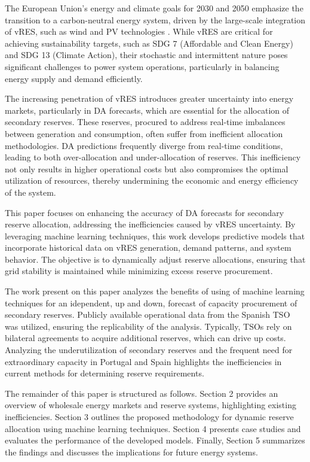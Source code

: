 The European Union's energy and climate goals for 2030 and 2050 emphasize the transition to a carbon-neutral energy system, driven by the large-scale integration of \gls{vRES}, such as wind and \gls{PV} technologies \cite{Perissi2022}. While \gls{vRES} are critical for achieving sustainability targets, such as \gls{SDG} 7 (Affordable and Clean Energy) and \gls{SDG} 13 (Climate Action), their stochastic and intermittent nature poses significant challenges to power system operations, particularly in balancing energy supply and demand efficiently.\cite{Ocker2017}\cite{Frade2019_wind}  \par
The increasing penetration of \gls{vRES} introduces greater uncertainty into energy markets, particularly in \gls{DA}  forecasts, which are essential for the allocation of secondary reserves. These reserves, procured to address real-time imbalances between generation and consumption, often suffer from inefficient allocation methodologies. \gls{DA} predictions frequently diverge from real-time conditions, leading to both over-allocation and under-allocation of reserves. This inefficiency not only results in higher operational costs but also compromises the optimal utilization of resources, thereby undermining the economic and energy efficiency of the system.\par
This paper focuses on enhancing the accuracy of \gls{DA}  forecasts for secondary reserve allocation, addressing the inefficiencies caused by \gls{vRES} uncertainty. By leveraging machine learning techniques, this work develops predictive models that incorporate historical data on \gls{vRES} generation, demand patterns, and system behavior. The objective is to dynamically adjust reserve allocations, ensuring that grid stability is maintained while minimizing excess reserve procurement.\par
The work present on this paper analyzes the benefits of using of machine learning techniques for an idependent, up and down, forecast of capacity procurement of secondary reserves. Publicly available operational data from the Spanish \gls{TSO} was utilized, ensuring the replicability of the analysis. Typically, \gls{TSO}s rely on bilateral agreements to acquire additional reserves, which can drive up costs. Analyzing the underutilization of secondary reserves and the frequent need for extraordinary capacity in Portugal and Spain highlights the inefficiencies in current methods for determining reserve requirements. \cite{EstanqueiroD5} \par
The remainder of this paper is structured as follows. Section 2 provides an overview of wholesale energy markets and reserve systems, highlighting existing inefficiencies. Section 3 outlines the proposed methodology for dynamic reserve allocation using machine learning techniques. Section 4 presents case studies and evaluates the performance of the developed models. Finally, Section 5 summarizes the findings and discusses the implications for future energy systems.\par


